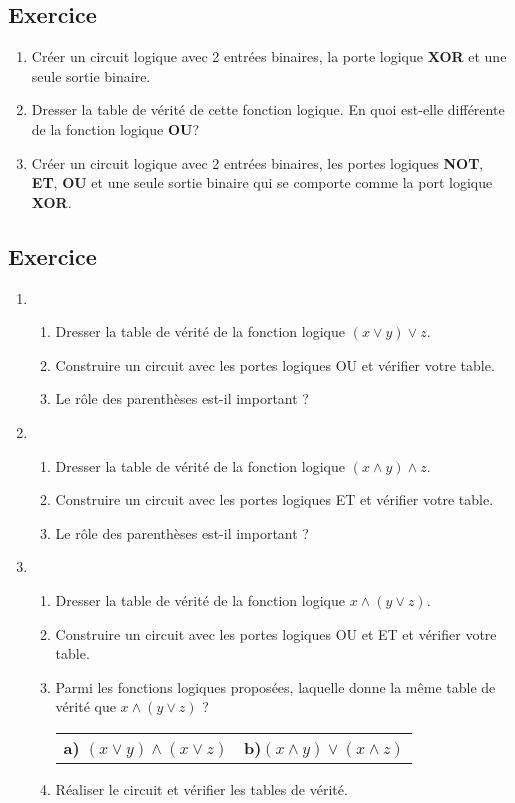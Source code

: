 \documentclass[11pt,a4paper]{article}
\newcounter{numexo}
\begin{document}
\addtocounter{numexo}{1}
\subsection*{\Large Exercice \thenumexo }
\begin{enumerate}
\item Créer un circuit logique avec 2 entrées binaires, la porte logique \textbf{XOR} et une seule sortie binaire.
\item Dresser la table de vérité de cette fonction logique. En quoi est-elle différente de la fonction logique \textbf{OU}?
\item Créer un circuit logique avec 2 entrées binaires, les portes logiques \textbf{NOT}, \textbf{ET}, \textbf{OU} et une seule sortie binaire qui se comporte comme la port logique \textbf{XOR}.
\end{enumerate}



\addtocounter{numexo}{1}
\subsection*{\Large Exercice \thenumexo }
\begin{enumerate}
\item \begin{enumerate}
\item Dresser la table de vérité de la fonction logique $(x \vee y) \vee z$.
\item Construire un circuit avec les portes logiques OU et vérifier votre table.
\item Le rôle des parenthèses est-il important ?
\end{enumerate} 
\item \begin{enumerate}
\item Dresser la table de vérité de la fonction logique $(x \wedge y) \wedge z$.
\item Construire un circuit avec les portes logiques ET et vérifier votre table.
\item Le rôle des parenthèses est-il important ?
\end{enumerate}
\item \begin{enumerate}
\item Dresser la table de vérité de la fonction logique $x \wedge (y \vee z)$.
\item Construire un circuit avec les portes logiques OU et ET et vérifier votre table.
\item Parmi les fonctions logiques proposées, laquelle donne la même table de vérité que $x \wedge (y \vee z)$ ?

\begin{tabular}{p{7cm}p{7cm}}
\textbf{a)} $(x \vee y) \wedge (x \vee z)$ & \textbf{b)}$(x \wedge y) \vee (x \wedge z)$\\
\end{tabular}
\item Réaliser le circuit et vérifier les tables de vérité.
\end{enumerate}
\end{enumerate}
\end{document}
